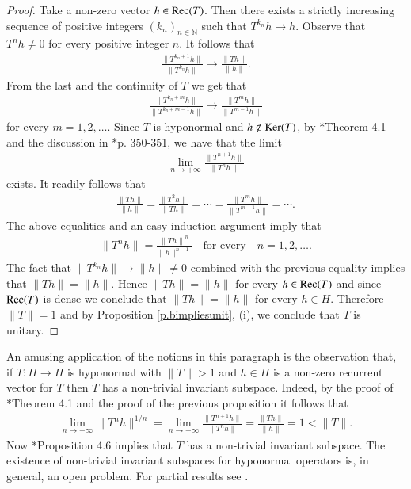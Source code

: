 \documentclass[12pt,leqno]{amsart}
\theoremstyle{plain}
\theoremstyle{definition}
\numberwithin{equation}{section}
\begin{document}
\begin{proof}
	Take a non-zero vector $h \in {\textnormal{Rec}}(T)$. Then there exists a strictly increasing sequence of positive integers $(k_n)_{n\in\mathbb N}$ such that $T^{k_n}h\to h$. Observe that $T^nh\neq 0$ for every positive integer $n$. It follows that 
	\begin{align*}
		\frac{\| T^{k_n+1}h\| }{\| T^{k_n}h\| }\to \frac{ \| Th\| }{\| h\| }. 
	\end{align*}
	From the last and the continuity of $T$ we get that
	\begin{align*}
		\frac{\| T^{k_n+m}h\| }{\| T^{k_n+m-1}h\| }\to \frac{ \| T^mh\| }{\| T^{m-1}h\| } 
	\end{align*}
	for every $m=1,2,\ldots$. Since $T$ is hyponormal and $h\notin {\textnormal{Ker}}( T) $, by \cite{Bourdon}*{Theorem 4.1} and the discussion in \cite{Bourdon}*{p. 350-351}, we have that the limit 
	\begin{align*}
		\lim_{n\to +\infty}\frac{\| T^{n+1}h\| }{\| T^nh\| } 
	\end{align*}
	exists. It readily follows that 
	\begin{align*}
		\frac{ \| Th\| }{\| h\| }=\frac{ \| T^2h\| }{\| Th\| }=\cdots =\frac{ \| T^mh\| }{\| T^{m-1}h\| }=\cdots . 
	\end{align*}
	The above equalities and an easy induction argument imply that
	\begin{align*}
		\| T^nh\| =\frac{{\| Th\| }^n}{\| h\|^{n-1} } \quad \text{for every} \quad n=1,2,\ldots . 
	\end{align*}
	The fact that $\| T^{k_n}h\| \to \| h\| \neq 0$ combined with the previous equality implies that $\| Th \| =\| h\|$. Hence $\| Th\|= \| h\| $ for every $h \in {\textnormal{Rec}}(T)$ and since ${\textnormal{Rec}}(T)$ is dense we conclude that $\| Th\| =\| h\| $ for every $h\in H$. Therefore $\| T\| =1$ and by Proposition \ref{p.bimpliesunit}, (i), we conclude that $T$ is unitary. 
\end{proof}

An amusing application of the notions in this paragraph is the observation that, if $T:H\to H$ is hyponormal with $\| T\| >1$ and $h\in H$ is a non-zero recurrent vector for $T$ then $T$ has a non-trivial invariant subspace. Indeed, by the proof of \cite{Bourdon}*{Theorem 4.1} and the proof of the previous proposition it follows that 
\begin{align*}
	\lim_{n\to +\infty}\| T^nh\|^{1/n}=\lim_{n\to +\infty}\frac{\| T^{n+1}h\| }{\| T^nh\| } =\frac{ \| Th\| }{\| h\| }=1< \| T\| . 
\end{align*}
Now \cite{Bourdon}*{Proposition 4.6} implies that $T$ has a non-trivial invariant subspace. The existence of non-trivial invariant subspaces for hyponormal operators is, in general, an open problem. For partial results see \cite{ScBr}.
\end{document}
